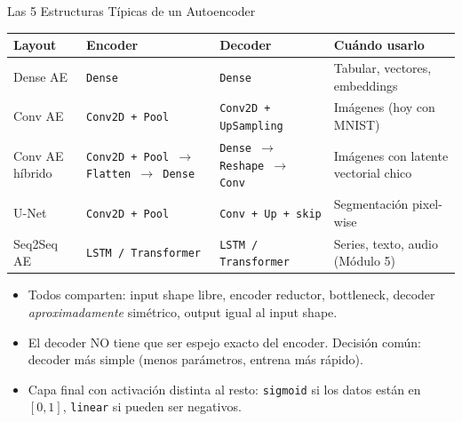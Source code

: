 \documentclass[aspectratio=169, 11pt]{beamer}
\begin{document}
\begin{frame}[shrink]{Las 5 Estructuras Típicas de un Autoencoder}
  \vspace{6pt}
  {\footnotesize
  \begin{tabular}{@{}p{2.8cm} p{3.1cm} p{3.4cm} p{4.0cm}@{}}
    \toprule
    \rowcolor{arcaLightGray}
    \textbf{Layout} & \textbf{Encoder} & \textbf{Decoder} & \textbf{Cuándo usarlo} \\
    \midrule
    Dense AE & \texttt{Dense} & \texttt{Dense} & Tabular, vectores, embeddings \\
    Conv AE & \texttt{Conv2D + Pool} & \texttt{Conv2D + UpSampling} & Imágenes (hoy con MNIST) \\
    Conv AE híbrido & \texttt{Conv2D + Pool $\to$ Flatten $\to$ Dense} & \texttt{Dense $\to$ Reshape $\to$ Conv} & Imágenes con latente vectorial chico \\
    U-Net & \texttt{Conv2D + Pool} & \texttt{Conv + Up + skip} & Segmentación pixel-wise \\
    Seq2Seq AE & \texttt{LSTM / Transformer} & \texttt{LSTM / Transformer} & Series, texto, audio (Módulo 5) \\
    \bottomrule
  \end{tabular}}
  \vspace{8pt}
  \begin{itemize}\setlength\itemsep{2pt}
    \item Todos comparten: input shape libre, encoder reductor, bottleneck, decoder \emph{aproximadamente} simétrico, output igual al input shape.
    \item El decoder NO tiene que ser espejo exacto del encoder. Decisión común: decoder más simple (menos parámetros, entrena más rápido).
    \item Capa final con activación distinta al resto: \texttt{sigmoid} si los datos están en $[0,1]$, \texttt{linear} si pueden ser negativos.
  \end{itemize}
\end{frame}
\end{document}
